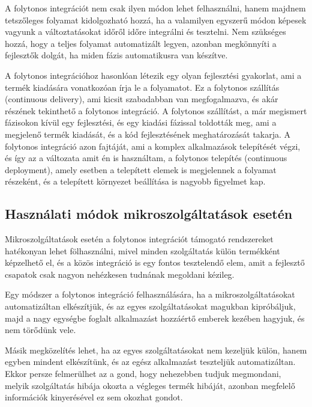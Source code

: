 \documentclass[11pt,magyar,a4paper,twoside,]{report}
\begin{document}
A folytonos integrációt nem csak ilyen módon lehet felhasználni, hanem
majdnem tetszőleges folyamat kidolgozható hozzá, ha a valamilyen
egyszerű módon képesek vagyunk a változtatásokat időről időre integrálni
és tesztelni. Nem szükséges hozzá, hogy a teljes folyamat automatizált
legyen, azonban megkönnyíti a fejlesztők dolgát, ha miden fázis
automatikusra van készítve.

A folytonos integrációhoz hasonlóan létezik egy olyan fejlesztési
gyakorlat, ami a termék kiadására vonatkozóan írja le a folyamatot. Ez a
folytonos szállítás\citep{continuous-delivery} (continuous delivery),
ami kicsit szabadabban van megfogalmazva, és akár részének tekinthető a
folytonos integráció. A folytonos szállítást, a már megismert fázisokon
kívül egy fejlesztési, és egy kiadási fázissal toldották meg, ami a
megjelenő termék kiadását, és a kód fejlesztésének meghatározását
takarja. A folytonos integráció azon fajtáját, ami a komplex
alkalmazások telepítését végzi, és így az a változata amit én is
használtam, a folytonos telepítés (continuous deployment), amely esetben
a telepített elemek is megjelennek a folyamat részeként, és a telepített
környezet beállítása is nagyobb figyelmet kap.

\subsection{Használati módok mikroszolgáltatások
esetén}\label{hasznuxe1lati-muxf3dok-mikroszolguxe1ltatuxe1sok-esetuxe9n}

Mikroszolgáltatások esetén a folytonos integrációt támogató rendszereket
hatékonyan lehet fölhasználni, mivel minden szolgáltatás külön
termékként képzelhető el, és a közös integráció is egy fontos
tesztelendő elem, amit a fejlesztő csapatok csak nagyon nehézkesen
tudnának megoldani kézileg.

Egy módszer a folytonos integráció felhasználására, ha a
mikroszolgáltatásokat automatizáltan elkészítjük, és az egyes
szolgáltatásokat magukban kipróbáljuk, majd a nagy egységbe foglalt
alkalmazást hozzáértő emberek kezében hagyjuk, és nem törődünk vele.

Másik megközelítés lehet, ha az egyes szolgáltatásokat nem kezeljük
külön, hanem egyben mindent elkészítünk, és az egész alkalmazást
teszteljük automatizáltan. Ekkor persze felmerülhet az a gond, hogy
nehezebben tudjuk megmondani, melyik szolgáltatás hibája okozta a
végleges termék hibáját, azonban megfelelő információk kinyerésével ez
sem okozhat gondot.
\end{document}
